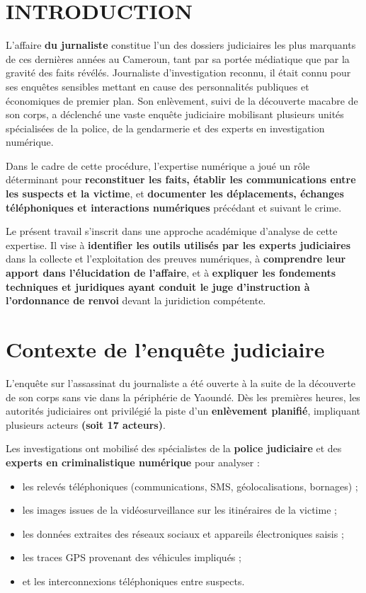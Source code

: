 \documentclass[memoire, 12pt]{report}
\begin{document}
\section*{INTRODUCTION}
L’affaire \textbf{du jurnaliste} constitue l’un des dossiers judiciaires les plus marquants de ces dernières années au Cameroun, tant par sa portée médiatique que par la gravité des faits révélés. Journaliste d’investigation reconnu, il était connu pour ses enquêtes sensibles mettant en cause des personnalités publiques et économiques de premier plan. Son enlèvement, suivi de la découverte macabre de son corps, a déclenché une vaste enquête judiciaire mobilisant plusieurs unités spécialisées de la police, de la gendarmerie et des experts en investigation numérique.

Dans le cadre de cette procédure, l’expertise numérique a joué un rôle déterminant pour \textbf{reconstituer les faits, établir les communications entre les suspects et la victime}, et \textbf{documenter les déplacements, échanges téléphoniques et interactions numériques} précédant et suivant le crime. 

Le présent travail s’inscrit dans une approche académique d’analyse de cette expertise. Il vise à \textbf{identifier les outils utilisés par les experts judiciaires} dans la collecte et l’exploitation des preuves numériques, à \textbf{comprendre leur apport dans l’élucidation de l’affaire}, et à \textbf{expliquer les fondements techniques et juridiques ayant conduit le juge d’instruction à l’ordonnance de renvoi} devant la juridiction compétente.

\newpage

\vspace{0.5cm}

\section{Contexte de l’enquête judiciaire}

L’enquête sur l’assassinat du journaliste a été ouverte à la suite de la découverte de son corps sans vie dans la périphérie de Yaoundé. Dès les premières heures, les autorités judiciaires ont privilégié la piste d’un \textbf{enlèvement planifié}, impliquant plusieurs acteurs \textbf{(soit  17 acteurs)}.

Les investigations ont mobilisé des spécialistes de la \textbf{police judiciaire} et des \textbf{experts en criminalistique numérique} pour analyser :
\begin{itemize}
    \item les relevés téléphoniques (communications, SMS, géolocalisations, bornages) ;
    \item les images issues de la vidéosurveillance sur les itinéraires de la victime ;
    \item les données extraites des réseaux sociaux et appareils électroniques saisis ;
    \item les traces GPS provenant des véhicules impliqués ;
    \item et les interconnexions téléphoniques entre suspects.
\end{itemize}
\end{document}
